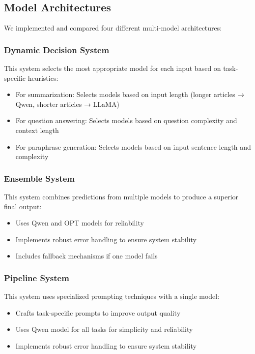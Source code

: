 \documentclass[10pt,twocolumn,letterpaper]{article}
\begin{document}
\subsection{Model Architectures}

We implemented and compared four different multi-model architectures:

\subsubsection{Dynamic Decision System}
This system selects the most appropriate model for each input based on task-specific heuristics:
\begin{itemize}
    \item For summarization: Selects models based on input length (longer articles → Qwen, shorter articles → LLaMA)
    \item For question answering: Selects models based on question complexity and context length
    \item For paraphrase generation: Selects models based on input sentence length and complexity
\end{itemize}

\subsubsection{Ensemble System}
This system combines predictions from multiple models to produce a superior final output:
\begin{itemize}
    \item Uses Qwen and OPT models for reliability
    \item Implements robust error handling to ensure system stability
    \item Includes fallback mechanisms if one model fails
\end{itemize}

\subsubsection{Pipeline System}
This system uses specialized prompting techniques with a single model:
\begin{itemize}
    \item Crafts task-specific prompts to improve output quality
    \item Uses Qwen model for all tasks for simplicity and reliability
    \item Implements robust error handling to ensure system stability
\end{itemize}
\end{document}

